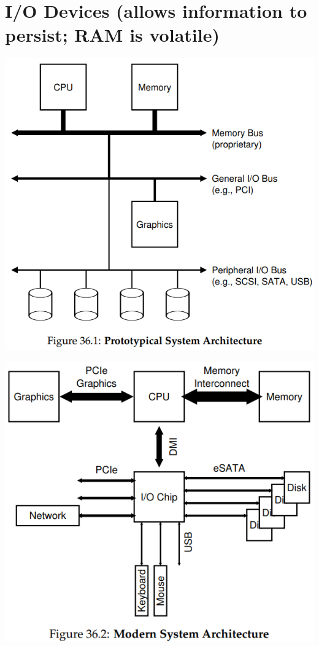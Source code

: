 \section*{I/O Devices (allows information to persist; RAM is volatile)}
\begin{minipage}{.5\linewidth}
\includegraphics[width=\linewidth]{imgs/prototypical_sys_arch}
\end{minipage}
\begin{minipage}{.5\linewidth}
\includegraphics[width=\linewidth]{imgs/modern_sys_arch}
\end{minipage}
